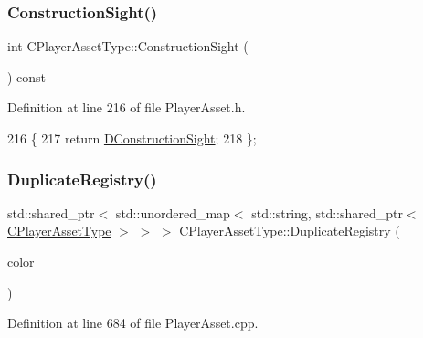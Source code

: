 \subsubsection{\texorpdfstring{Construction\+Sight()}{ConstructionSight()}}
{\footnotesize\ttfamily int C\+Player\+Asset\+Type\+::\+Construction\+Sight (\begin{DoxyParamCaption}{ }\end{DoxyParamCaption}) const\hspace{0.3cm}{\ttfamily [inline]}}



Definition at line 216 of file Player\+Asset.\+h.


\begin{DoxyCode}
216                                      \{
217             \textcolor{keywordflow}{return} \hyperlink{classCPlayerAssetType_a71b34081d4540087472af3cb9052e04a}{DConstructionSight};  
218         \};
\end{DoxyCode}
\hypertarget{classCPlayerAssetType_a6dfbccbbed7fecec6b7e2c51ac22fe5a}{}\label{classCPlayerAssetType_a6dfbccbbed7fecec6b7e2c51ac22fe5a} 
\subsubsection{\texorpdfstring{Duplicate\+Registry()}{DuplicateRegistry()}}
{\footnotesize\ttfamily std\+::shared\+\_\+ptr$<$ std\+::unordered\+\_\+map$<$ std\+::string, std\+::shared\+\_\+ptr$<$ \hyperlink{classCPlayerAssetType}{C\+Player\+Asset\+Type} $>$ $>$ $>$ C\+Player\+Asset\+Type\+::\+Duplicate\+Registry (\begin{DoxyParamCaption}\item[{\hyperlink{GameDataTypes_8h_aafb0ca75933357ff28a6d7efbdd7602f}{E\+Player\+Color}}]{color }\end{DoxyParamCaption})\hspace{0.3cm}{\ttfamily [static]}}



Definition at line 684 of file Player\+Asset.\+cpp.


